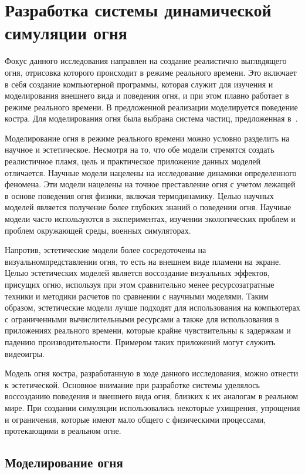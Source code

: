 \chapter{Разработка системы динамической симуляции огня}

Фокус данного исследования направлен на создание реалистично выглядящего огня,
отрисовка которого происходит в режиме реального времени. Это включает в себя
создание компьютерной программы, которая служит для изучения и моделирования
внешнего вида и поведения огня, и при этом плавно работает в режиме реального
времени. В предложенной реализации моделируется поведение костра. Для
моделирования огня была выбрана система частиц, предложенная
в~\cite{reewes1983}.

Моделирование огня в режиме реального времени можно условно разделить на научное
и эстетическое. Несмотря на то, что обе модели стремятся создать реалистичное
пламя, цель и практическое приложение данных моделей отличается. Научные модели
нацелены на исследование динамики определенного феномена. Эти модели нацелены на
точное преставление огня с учетом лежащей в основе поведения огня физики,
включая термодинамику. Целью научных моделей является получение более глубоких
знаний о поведении огня. Научные модели часто используются в экспериментах,
изучении экологических проблем и проблем окружающей среды, военных симуляторах.

Напротив, эстетические модели более сосредоточены на
визуальном\break{}представлении огня, то есть на внешнем виде пламени на экране.
Целью эстетических моделей является воссоздание визуальных эффектов, присущих
огню, используя при этом сравнительно менее ресурсозатратные техники и методики
расчетов по сравнении с научными моделями. Таким образом, эстетические модели
лучше подходят для использования на компьютерах с ограниченными вычислительными
ресурсами а также для использования в приложениях реального времени, которые
крайне чувствительны к задержкам и падению производительности. Примером таких
приложений могут служить видеоигры.

Модель огня костра, разработанную в ходе данного исследования, можно отнести к
эстетической. Основное внимание при разработке системы уделялось воссозданию
поведения и внешнего вида огня, близких к их аналогам в реальном мире. При
создании симуляции использовались некоторые ухищрения, упрощения и ограничения,
которые имеют мало общего с физическими процессами, протекающими в реальном
огне.

\section{Моделирование огня}

